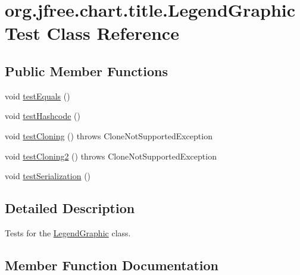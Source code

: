 \hypertarget{classorg_1_1jfree_1_1chart_1_1title_1_1_legend_graphic_test}{}\section{org.\+jfree.\+chart.\+title.\+Legend\+Graphic\+Test Class Reference}
\label{classorg_1_1jfree_1_1chart_1_1title_1_1_legend_graphic_test}
\subsection*{Public Member Functions}
\begin{DoxyCompactItemize}
\item 
void \mbox{\hyperlink{classorg_1_1jfree_1_1chart_1_1title_1_1_legend_graphic_test_a50995d480824f5644d00ae144bfec63f}{test\+Equals}} ()
\item 
void \mbox{\hyperlink{classorg_1_1jfree_1_1chart_1_1title_1_1_legend_graphic_test_a1aee772ed637842327c2da00416aa969}{test\+Hashcode}} ()
\item 
void \mbox{\hyperlink{classorg_1_1jfree_1_1chart_1_1title_1_1_legend_graphic_test_a8af5d7bc01a2f0a0749556b0d7dd06c6}{test\+Cloning}} ()  throws Clone\+Not\+Supported\+Exception 
\item 
void \mbox{\hyperlink{classorg_1_1jfree_1_1chart_1_1title_1_1_legend_graphic_test_ab538ce13e0aa4282993f51e96c952f06}{test\+Cloning2}} ()  throws Clone\+Not\+Supported\+Exception 
\item 
void \mbox{\hyperlink{classorg_1_1jfree_1_1chart_1_1title_1_1_legend_graphic_test_ac9ffe1e3e45a1786bcaa443e1d9a0cac}{test\+Serialization}} ()
\end{DoxyCompactItemize}


\subsection{Detailed Description}
Tests for the \mbox{\hyperlink{classorg_1_1jfree_1_1chart_1_1title_1_1_legend_graphic}{Legend\+Graphic}} class. 

\subsection{Member Function Documentation}
\mbox{\label{classorg_1_1jfree_1_1chart_1_1title_1_1_legend_graphic_test_a8af5d7bc01a2f0a0749556b0d7dd06c6}} 
